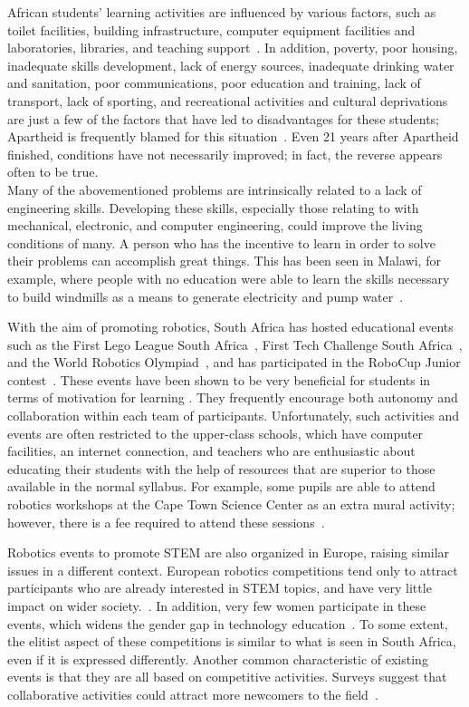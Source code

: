 \documentclass{intech-journal}
\begin{document}
African students' learning activities are influenced by various factors, such as toilet facilities, building infrastructure, computer equipment facilities and laboratories,  libraries, and teaching support~\cite{sedibe2011inequality}. 
In addition, poverty, poor housing, inadequate skills development, lack of energy sources, inadequate drinking water and sanitation, poor communications, poor education and training, lack of transport, lack of sporting, and recreational activities and cultural deprivations are just a few of the factors that have led to disadvantages for these students; Apartheid is frequently blamed for this situation~\cite{mokoena2009improving}. 
Even 21 years after Apartheid finished, conditions have not necessarily improved; in fact, the reverse appears often to be true.
\\
\hspace{1cm}Many of the abovementioned problems are intrinsically related to a lack of engineering skills. 
Developing these skills, especially those relating to with mechanical, electronic, and computer engineering, could improve the living conditions of many. 
A person who has the incentive to learn in order to solve their problems can accomplish great things.
This has been seen in Malawi, for example, where people with no education were able to learn the skills necessary to build windmills as a means to generate electricity and pump water~\cite{Sheerin2009}.


With the aim of promoting robotics, South Africa has hosted educational events such as the First Lego League South Africa~\cite{FLLSA}, First Tech Challenge South Africa~\cite{FTCA}, and the World Robotics Olympiad~\cite{WRO}, and has participated in the RoboCup Junior contest~\cite{ferrein2011robocup}. 
These events have been shown to be very beneficial for students in terms of motivation for learning \cite{deci1985intrinsic}. 
They frequently encourage both autonomy and collaboration within each team of participants.
Unfortunately, such activities and events are often restricted to the upper-class schools, which have computer facilities, an internet connection, and teachers who are enthusiastic about educating their students with the help of resources that are superior to those available in the normal syllabus. 
For example, some pupils are able to attend robotics workshops at the Cape Town Science Center as an extra mural activity; however, there is a fee required to attend these sessions~\cite{Capets}.

Robotics events to promote STEM are also organized in Europe, raising similar issues in a different context.
European robotics competitions tend only to attract participants who are already interested in STEM topics, and have very little impact on wider society.~\cite{riedo2013upgrade}.
In addition, very few women participate in these events, which widens the gender gap in technology education~\cite{riedo2013upgrade}.
To some extent, the elitist aspect of these competitions is similar to what is seen in South Africa, even if it is expressed differently.
Another common characteristic of existing events is that they are all based on competitive activities. 
Surveys suggest that collaborative activities could attract more newcomers to the field~\cite{riedo2013upgrade}.
\end{document}
